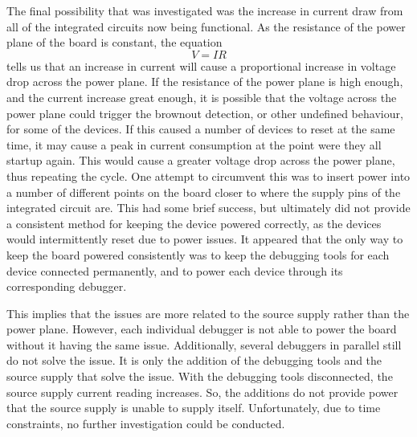 The final possibility that was investigated was the increase in current draw from all of the integrated circuits now being functional.
As the resistance of the power plane of the board is constant,
the equation \[V = IR\] tells us that an increase in current will cause a proportional increase in voltage drop across the power plane.
If the resistance of the power plane is high enough, and the current increase great enough,
it is possible that the voltage across the power plane could trigger the brownout detection, or other undefined behaviour, for some of the devices.
If this caused a number of devices to reset at the same time, it may cause a peak in current consumption at the point were they all startup again.
This would cause a greater voltage drop across the power plane, thus repeating the cycle.
One attempt to circumvent this was to insert power into a number of different points on the board
closer to where the supply pins of the integrated circuit are.
This had some brief success, but ultimately did not provide a consistent method for keeping the device powered correctly,
as the devices would intermittently reset due to power issues.
It appeared that the only way to keep the board powered consistently was to keep the debugging tools for each device connected permanently,
and to power each device through its corresponding debugger.

This implies that the issues are more related to the source supply rather than the power plane.
However, each individual debugger is not able to power the board without it having the same issue.
Additionally, several debuggers in parallel still do not solve the issue.
It is only the addition of the debugging tools and the source supply that solve the issue.
With the debugging tools disconnected, the source supply current reading increases.
So, the additions do not provide power that the source supply is unable to supply itself.
Unfortunately, due to time constraints, no further investigation could be conducted.
